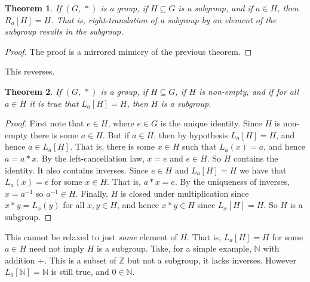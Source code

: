 \documentclass{article}
\theoremstyle{plain}
\newtheorem{theorem}{Theorem}[section]
\theoremstyle{normal}
\begin{document}
        \begin{theorem}
            If $(G,\,*)$ is a group, if $H\subseteq{G}$ is a subgroup, and if
            $a\in{H}$, then $R_{a}[H]=H$. That is, right-translation of a
            subgroup by an element of the subgroup results in the subgroup.
        \end{theorem}
        \begin{proof}
            The proof is a mirrored mimicry of the previous theorem.
        \end{proof}
        This reverses.
        \begin{theorem}
            If $(G,\,*)$ is a group, if $H\subseteq{G}$, if $H$ is non-empty,
            and if for all $a\in{H}$ it is true that
            $L_{a}[H]=H$, then $H$ is a subgroup.
        \end{theorem}
        \begin{proof}
            First note that $e\in{H}$, where $e\in{G}$ is the unique identity.
            Since $H$ is non-empty there is some $a\in{H}$. But if $a\in{H}$,
            then by hypothesis $L_{a}[H]=H$, and hence $a\in{L}_{a}[H]$.
            That is, there is some $x\in{H}$ such that $L_{a}(x)=a$, and hence
            $a=a*x$. By the left-cancellation law, $x=e$ and $e\in{H}$. So $H$
            contains the identity. It also contains inverses. Since $e\in{H}$
            and $L_{a}[H]=H$ we have that $L_{a}(x)=e$ for some $x\in{H}$.
            That is, $a*x=e$. By the uniqueness of inverses, $x=a^{-1}$ so
            $a^{-1}\in{H}$. Finally, $H$ is
            closed under multiplication since $x*y=L_{x}(y)$ for all
            $x,y\in{H}$, and hence $x*y\in{H}$ since
            $L_{x}[H]=H$. So $H$ is a subgroup.
        \end{proof}
        This cannot be relaxed to just \textit{some} element of $H$. That is,
        $L_{a}[H]=H$ for some $a\in{H}$ need not imply $H$ is a subgroup. Take,
        for a simple example, $\mathbb{N}$ with addition $+$. This is a subset
        of $\mathbb{Z}$ but not a subgroup, it lacks inverses. However
        $L_{0}[\mathbb{N}]=\mathbb{N}$ is still true, and $0\in\mathbb{N}$.
\end{document}
